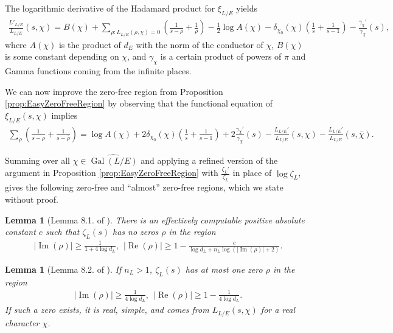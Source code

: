 \documentclass[12pt]{amsart}
\newtheorem{lem}[thm]{Lemma}
\theoremstyle{definition}
\theoremstyle{remark}
\numberwithin{equation}{section}
\DeclareMathOperator{\re}{Re}
\DeclareMathOperator{\im}{Im}
\DeclareMathOperator{\Gal}{Gal}
\begin{document}
 The logarithmic derivative of the Hadamard product for $\xi_{L/E}$ yields
\begin{align} \label{eqn:logDerHadamard}
\frac{L'_{L/E}}{L_{L/E}}(s, \chi) = B(\chi) + \sum_{\rho: L_{L/E}(\rho,\chi) = 0}\left(\frac{1}{s-\rho} + \frac{1}{\rho}\right) - \frac{1}{2} \log A(\chi) - \delta_{\chi_{0}}(\chi)\left(\frac{1}{s} + \frac{1}{s-1}\right) - \frac{\gamma_{\chi}'}{\gamma_{\chi}}(s),
\end{align}
where $A(\chi)$ is the product of $d_{E}$ with the norm of the conductor of $\chi$, $B(\chi)$ is some constant depending on $\chi$, and $\gamma_{\chi}$ is a certain product of powers of $\pi$ and Gamma functions coming from the infinite places.

We can now improve the zero-free region from Proposition \ref{prop:EasyZeroFreeRegion} by observing that the functional equation of $\xi_{L/E}(s,\chi)$ implies
\begin{align} \label{eqn:logDerHadamardFnEqn}
\sum_{\rho}\left(\frac{1}{s-\rho} + \frac{1}{s - \overline{\rho}}\right)
= \log A(\chi) + 2\delta_{\chi_{0}}(\chi)\left(\frac{1}{s} + \frac{1}{s-1}\right) + 2 \frac{\gamma_{\chi}'}{\gamma_\chi}(s) - \frac{L_{L/E}'}{L_{L/E}}(s, \chi) - \frac{L_{L/E}'}{L_{L/E}}(s, \overline{\chi}).
\end{align}

Summing over all $\chi\in \widehat{\Gal(L/E)}$ and applying a refined version of the argument in Proposition \ref{prop:EasyZeroFreeRegion} with $\frac{\zeta_{L}'}{\zeta_{L}}$ in place of $\log \zeta_{L}$, gives the following zero-free and ``almost'' zero-free regions, which we state without proof.

\begin{lem}[Lemma 8.1. of \cite{LagariasOdlyzko77}]
There is an effectively computable positive absolute constant $c$ such that $\zeta_{L}(s)$ has no zeros $\rho$ in the region
\begin{align}
|\im(\rho)| \geq \frac{1}{1 + 4 \log d_{L}}, \ \ |\re(\rho)| \geq 1 - \frac{c}{\log d_{L} + n_{L} \log(|\im(\rho)| + 2)}.
\end{align}
\end{lem}

\begin{lem}[Lemma 8.2. of \cite{LagariasOdlyzko77}]
If $n_{L} > 1$, $\zeta_{L}(s)$ has at most one zero $\rho$ in the region
\begin{align}
|\im(\rho)| \geq \frac{1}{4 \log d_{L}}, \ \ |\re(\rho)| \geq 1 - \frac{1}{4\log d_{L}}.
\end{align}
If such a zero exists, it is real, simple, and comes from $L_{L/E}(s, \chi)$ for a real character $\chi$.
\end{lem}
\end{document}
